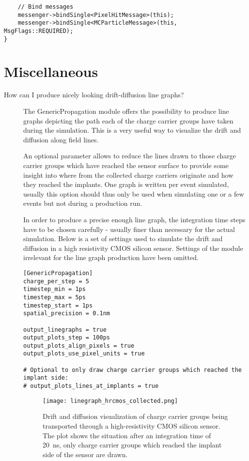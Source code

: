 \begin{description}
\begin{verbatim}
    // Bind messages
    messenger->bindSingle<PixelHitMessage>(this);
    messenger->bindSingle<MCParticleMessage>(this, MsgFlags::REQUIRED);
}
\end{verbatim}
\end{description}

\section{Miscellaneous}
\begin{description}
\item[How can I produce nicely looking drift-diffusion line graphs?]
The GenericPropagation module offers the possibility to produce line graphs depicting the path each of the charge carrier groups have taken during the simulation. This is a very useful way to visualize the drift and diffusion along field lines.

An optional parameter allows to reduce the lines drawn to those charge carrier groups which have reached the sensor surface to provide some insight into where from the collected charge carriers originate and how they reached the implants.
One graph is written per event simulated, usually this option should thus only be used when simulating one or a few events but not during a production run.

In order to produce a precise enough line graph, the integration time steps have to be chosen carefully - usually finer than necessary for the actual simulation. Below is a set of settings used to simulate the drift and diffusion in a high resistivity CMOS silicon sensor.
Settings of the module irrelevant for the line graph production have been omitted.

\begin{verbatim}
[GenericPropagation]
charge_per_step = 5
timestep_min = 1ps
timestep_max = 5ps
timestep_start = 1ps
spatial_precision = 0.1nm

output_linegraphs = true
output_plots_step = 100ps
output_plots_align_pixels = true
output_plots_use_pixel_units = true

# Optional to only draw charge carrier groups which reached the implant side:
# output_plots_lines_at_implants = true
\end{verbatim}

\begin{figure}[tbp]
    \centering
  \texttt{[image: linegraph\_hrcmos\_collected.png]}
  \caption{Drift and diffusion visualization of charge carrier groups being transported through a high-resistivity CMOS silicon sensor. The plot shows the situation after an integration time of \SI{20}{\nano \second}, only charge carrier groups which reached the implant side of the sensor are drawn.}
  \label{fig:linegraph}
\end{figure}


\end{description}
